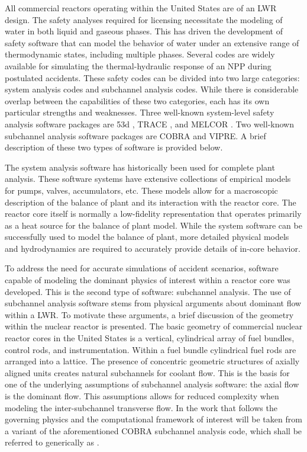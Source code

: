 All commercial reactors operating within the United States are of an LWR design.
The safety analyses required for licensing necessitate the modeling of water in both liquid and gaseous phases.
This has driven the development of safety software that can model the behavior of water under an extensive range of thermodynamic states, including multiple phases.
Several codes are widely available for simulating the thermal-hydraulic response of an NPP during postulated accidents.
These safety codes can be divided into two large categories: system analysis codes and subchannel analysis codes.
While there is considerable overlap between the capabilities of these two categories, each has its own particular strengths and weaknesses.
Three well-known system-level safety analysis software packages are \relap53d{} \cite{RELAP}, TRACE \cite{TRACE}, and MELCOR \cite{Summers1994}.
Two well-known subchannel analysis software packages are COBRA \cite{Thurgood1983c} and VIPRE.
A brief description of these two types of software is provided below.

The system analysis software has historically been used for complete plant analysis.
These software systems have extensive collections of empirical models for pumps, valves, accumulators, etc.
These models allow for a macroscopic description of the balance of plant and its interaction with the
reactor core.
The reactor core itself is normally a low-fidelity representation that operates primarily as a heat source for the balance of plant model.
While the system software can be successfully used to model the balance of plant, more detailed physical models and hydrodynamics are required to accurately provide details of in-core behavior.

To address the need for accurate simulations of accident scenarios, software capable of modeling the dominant physics of interest within a reactor core was developed.
This is the second type of software: subchannel analysis.
The use of subchannel analysis software stems from physical arguments about dominant flow within a LWR.
To motivate these arguments, a brief discussion of the geometry within the nuclear reactor is presented.
The basic geometry of commercial nuclear reactor cores in the United States is a vertical, cylindrical array of fuel bundles, control rods, and instrumentation.
Within a fuel bundle cylindrical fuel rods are arranged into a lattice.
The presence of concentric geometric structures of axially aligned units creates natural subchannels for coolant flow.
This is the basis for one of the underlying assumptions of subchannel analysis software: the axial flow is the dominant flow.
This assumptions allows for reduced complexity when modeling the inter-subchannel transverse flow.
In the work that follows the governing physics and the computational framework of interest will be taken from a variant of the aforementioned COBRA subchannel analysis code, which shall be referred to generically as \cobra{}.


